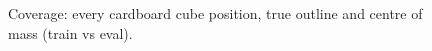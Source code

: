 \begin{figure}[t]
\centering

\caption{Coverage: every cardboard cube position, true outline and centre of mass (train vs eval).}
\label{fig:coverage}
\end{figure}
